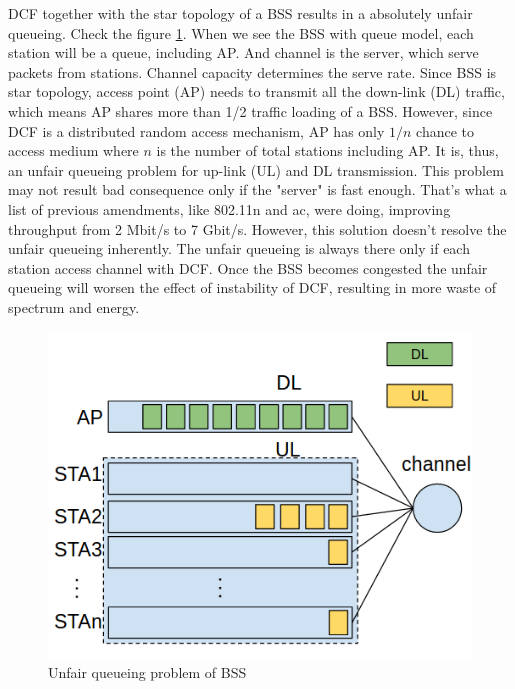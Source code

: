 DCF together with the star topology of a BSS results in a absolutely unfair queueing. 
Check the figure \ref{fig_unfair_queueing}.
When we see the BSS with queue model, each station will be a queue, including AP.
And channel is the server, which serve packets from stations. Channel capacity determines the serve rate.
Since BSS is star topology, access point (AP) needs to transmit all the down-link (DL) traffic, which means AP shares more than 1/2 traffic loading of a BSS. 
However, since DCF is a distributed random access mechanism, AP has only $1/n$ chance to access medium where $n$ is the number of total stations including AP. It is, thus, an unfair queueing problem for up-link (UL) and DL transmission. 
This problem may not result bad consequence only if the "server" is fast enough. 
That's what a list of previous amendments, like 802.11n and ac, were doing, improving throughput from 2 Mbit/s to 7 Gbit/s. 
However, this solution doesn't resolve the unfair queueing inherently. 
The unfair queueing is always there only if each station access channel with DCF.
Once the BSS becomes congested the unfair queueing will worsen the effect of instability of DCF, resulting in more waste of spectrum and energy.
\begin{figure}[!h]
\centering
\includegraphics[scale=0.5]{./figure/chp1/unfair_queueing.png}
\caption{Unfair queueing problem of BSS}
\label{fig_unfair_queueing}
\end{figure}


